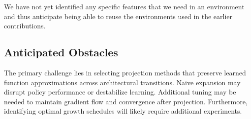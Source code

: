 We have not yet identified any specific features that we need in an environment
and thus anticipate being able to reuse the environments used in the 
earlier contributions.

\subsection{Anticipated Obstacles}
The primary challenge lies in selecting projection methods that preserve 
learned function approximations across architectural transitions. 
Naive expansion may disrupt policy performance or destabilize learning. 
Additional tuning may be needed to maintain gradient flow and convergence 
after projection. Furthermore, identifying optimal growth schedules will 
likely require additional experiments.